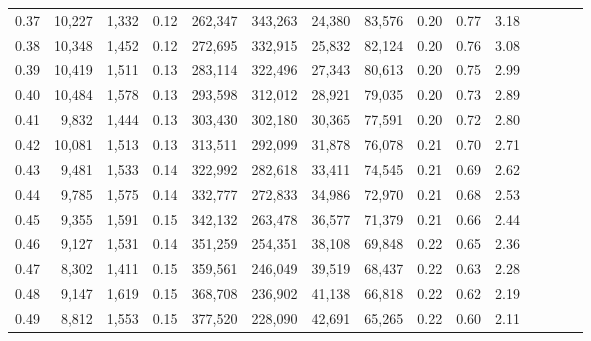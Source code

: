 \begin{tabular}{rrrcrrrrrrrrrrr}
0.37 &  10,227 &  1,332 &                                       0.12 &  262,347 &  343,263 &   24,380 &   83,576 &  0.20 &  0.77 &                         3.18 \\
0.38 &  10,348 &  1,452 &                                       0.12 &  272,695 &  332,915 &   25,832 &   82,124 &  0.20 &  0.76 &                         3.08 \\
0.39 &  10,419 &  1,511 &                                       0.13 &  283,114 &  322,496 &   27,343 &   80,613 &  0.20 &  0.75 &                         2.99 \\
0.40 &  10,484 &  1,578 &                                       0.13 &  293,598 &  312,012 &   28,921 &   79,035 &  0.20 &  0.73 &                         2.89 \\
0.41 &   9,832 &  1,444 &                                       0.13 &  303,430 &  302,180 &   30,365 &   77,591 &  0.20 &  0.72 &                         2.80 \\
0.42 &  10,081 &  1,513 &                                       0.13 &  313,511 &  292,099 &   31,878 &   76,078 &  0.21 &  0.70 &                         2.71 \\
0.43 &   9,481 &  1,533 &                                       0.14 &  322,992 &  282,618 &   33,411 &   74,545 &  0.21 &  0.69 &                         2.62 \\
0.44 &   9,785 &  1,575 &                                       0.14 &  332,777 &  272,833 &   34,986 &   72,970 &  0.21 &  0.68 &                         2.53 \\
0.45 &   9,355 &  1,591 &                                       0.15 &  342,132 &  263,478 &   36,577 &   71,379 &  0.21 &  0.66 &                         2.44 \\
0.46 &   9,127 &  1,531 &                                       0.14 &  351,259 &  254,351 &   38,108 &   69,848 &  0.22 &  0.65 &                         2.36 \\
0.47 &   8,302 &  1,411 &                                       0.15 &  359,561 &  246,049 &   39,519 &   68,437 &  0.22 &  0.63 &                         2.28 \\
0.48 &   9,147 &  1,619 &                                       0.15 &  368,708 &  236,902 &   41,138 &   66,818 &  0.22 &  0.62 &                         2.19 \\
0.49 &   8,812 &  1,553 &                                       0.15 &  377,520 &  228,090 &   42,691 &   65,265 &  0.22 &  0.60 &                         2.11 \\

\end{tabular}
